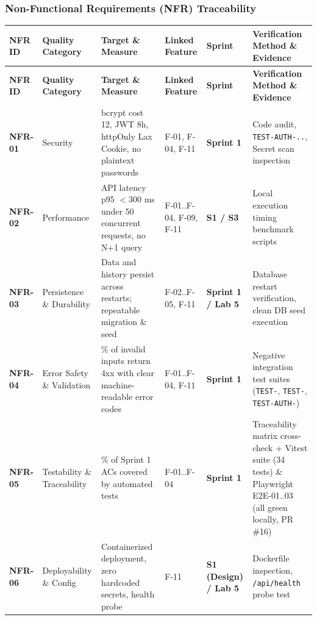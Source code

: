 \documentclass[11pt,a4paper]{article}
\begin{document}
\subsubsection{Non-Functional Requirements (NFR) Traceability}

\small
\vspace{0.3em}
\begin{longtable}{|>{\RaggedRight}p{1.5cm}|>{\RaggedRight}p{2.2cm}|>{\RaggedRight}p{3.8cm}|>{\centering\arraybackslash}p{1.4cm}|>{\centering\arraybackslash}p{1.4cm}|>{\RaggedRight}p{3.9cm}|}
\hline
\rowcolor{zenPale}\textbf{NFR ID} & \textbf{Quality Category} & \textbf{Target \& Measure} & \textbf{Linked Feature} & \textbf{Sprint} & \textbf{Verification Method \& Evidence} \\ \hline
\endfirsthead
\hline
\rowcolor{zenPale}\textbf{NFR ID} & \textbf{Quality Category} & \textbf{Target \& Measure} & \textbf{Linked Feature} & \textbf{Sprint} & \textbf{Verification Method \& Evidence} \\ \hline
\endhead
\hline
\endfoot
\textbf{NFR-01} & Security & bcrypt cost 12, JWT 8h, httpOnly Lax Cookie, no plaintext passwords & F-01, F-04, F-11 & \textbf{Sprint 1} & Code audit, \texttt{TEST-\allowbreak AUTH-\allowbreak 01.\allowbreak .\allowbreak 05}, Secret scan inspection \\ \hline
\textbf{NFR-02} & Performance & API latency p95 $< 300$ ms under 50 concurrent requests, no N+1 query & F-01..F-04, F-09, F-11 & \textbf{S1 / S3} & Local execution timing benchmark scripts \\ \hline
\textbf{NFR-03} & Persistence \& Durability & Data and history persist across restarts; repeatable migration \& seed & F-02..F-05, F-11 & \textbf{Sprint 1 / Lab 5} & Database restart verification, clean DB seed execution \\ \hline
\textbf{NFR-04} & Error Safety \& Validation & 100\% of invalid inputs return 4xx with clear machine-readable error codes & F-01..F-04, F-11 & \textbf{Sprint 1} & Negative integration test suites (\texttt{TEST-\allowbreak 02}, \texttt{TEST-\allowbreak 12}, \texttt{TEST-\allowbreak AUTH-\allowbreak 02}) \\ \hline
\textbf{NFR-05} & Testability \& Traceability & 100\% of Sprint 1 ACs covered by automated tests & F-01..F-04 & \textbf{Sprint 1} & Traceability matrix cross-check + Vitest suite (34 tests) \& Playwright E2E-01..03 (all green locally, PR \#16) \\ \hline
\textbf{NFR-06} & Deployability \& Config & Containerized deployment, zero hardcoded secrets, health probe & F-11 & \textbf{S1 (Design) / Lab 5} & Dockerfile inspection, \texttt{/\allowbreak api/\allowbreak health} probe test \\ \hline
\end{longtable}
\vspace{0.3em}
\end{document}
